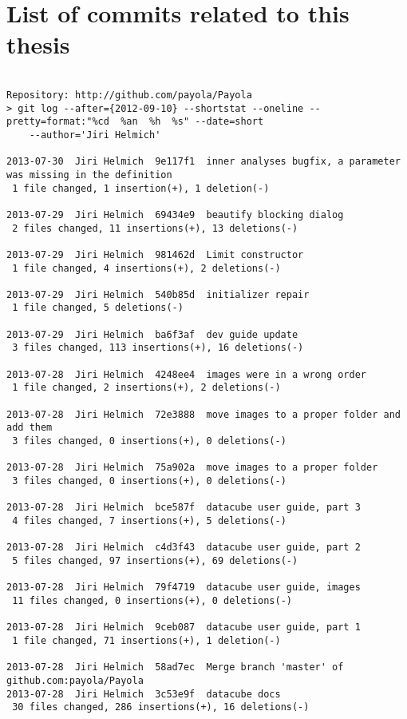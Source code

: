 \chapter{List of commits related to this thesis}
{\scriptsize
\begin{verbatim}

Repository: http://github.com/payola/Payola
> git log --after={2012-09-10} --shortstat --oneline --pretty=format:"%cd  %an  %h  %s" --date=short
    --author='Jiri Helmich'

2013-07-30  Jiri Helmich  9e117f1  inner analyses bugfix, a parameter was missing in the definition
 1 file changed, 1 insertion(+), 1 deletion(-)

2013-07-29  Jiri Helmich  69434e9  beautify blocking dialog
 2 files changed, 11 insertions(+), 13 deletions(-)

2013-07-29  Jiri Helmich  981462d  Limit constructor
 1 file changed, 4 insertions(+), 2 deletions(-)

2013-07-29  Jiri Helmich  540b85d  initializer repair
 1 file changed, 5 deletions(-)

2013-07-29  Jiri Helmich  ba6f3af  dev guide update
 3 files changed, 113 insertions(+), 16 deletions(-)

2013-07-28  Jiri Helmich  4248ee4  images were in a wrong order
 1 file changed, 2 insertions(+), 2 deletions(-)

2013-07-28  Jiri Helmich  72e3888  move images to a proper folder and add them
 3 files changed, 0 insertions(+), 0 deletions(-)

2013-07-28  Jiri Helmich  75a902a  move images to a proper folder
 3 files changed, 0 insertions(+), 0 deletions(-)

2013-07-28  Jiri Helmich  bce587f  datacube user guide, part 3
 4 files changed, 7 insertions(+), 5 deletions(-)

2013-07-28  Jiri Helmich  c4d3f43  datacube user guide, part 2
 5 files changed, 97 insertions(+), 69 deletions(-)

2013-07-28  Jiri Helmich  79f4719  datacube user guide, images
 11 files changed, 0 insertions(+), 0 deletions(-)

2013-07-28  Jiri Helmich  9ceb087  datacube user guide, part 1
 1 file changed, 71 insertions(+), 1 deletion(-)

2013-07-28  Jiri Helmich  58ad7ec  Merge branch 'master' of github.com:payola/Payola
2013-07-28  Jiri Helmich  3c53e9f  datacube docs
 30 files changed, 286 insertions(+), 16 deletions(-)


\end{verbatim}}
